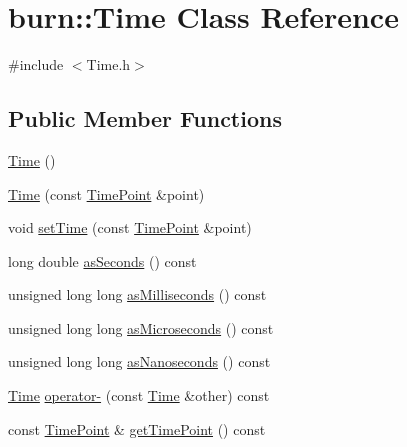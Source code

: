 \hypertarget{classburn_1_1_time}{\section{burn\-:\-:Time Class Reference}
\label{classburn_1_1_time}
}


{\ttfamily \#include $<$Time.\-h$>$}

\subsection*{Public Member Functions}
\begin{DoxyCompactItemize}
\item 
\hyperlink{classburn_1_1_time_a1d23a0a88aa2eeb342a2d8acb4b86cf3}{Time} ()
\item 
\hyperlink{classburn_1_1_time_ac56700cc46aa55773938f1f3fe1bdc4e}{Time} (const \hyperlink{namespaceburn_a431c4128e194f6d8909971ef6253bca9}{Time\-Point} \&point)
\item 
void \hyperlink{classburn_1_1_time_a360877b3779ec6fd3e4993f1fc4a48c3}{set\-Time} (const \hyperlink{namespaceburn_a431c4128e194f6d8909971ef6253bca9}{Time\-Point} \&point)
\item 
long double \hyperlink{classburn_1_1_time_a5fcb537fbce65dc08b54e6494de42fce}{as\-Seconds} () const 
\item 
unsigned long long \hyperlink{classburn_1_1_time_ad55a56bdd08f72d0649bcd54c658bb82}{as\-Milliseconds} () const 
\item 
unsigned long long \hyperlink{classburn_1_1_time_a0fb0aaabbbf1f186f91231b3d987203e}{as\-Microseconds} () const 
\item 
unsigned long long \hyperlink{classburn_1_1_time_a104120a69544ee338f93c32a6663c35a}{as\-Nanoseconds} () const 
\item 
\hyperlink{classburn_1_1_time}{Time} \hyperlink{classburn_1_1_time_a28ec8ef74d89d1ef200a41a6aa5a9ccd}{operator-\/} (const \hyperlink{classburn_1_1_time}{Time} \&other) const 
\item 
const \hyperlink{namespaceburn_a431c4128e194f6d8909971ef6253bca9}{Time\-Point} \& \hyperlink{classburn_1_1_time_a67c20bcaf4e0c38264e88e78b8e641ad}{get\-Time\-Point} () const 
\end{DoxyCompactItemize}
